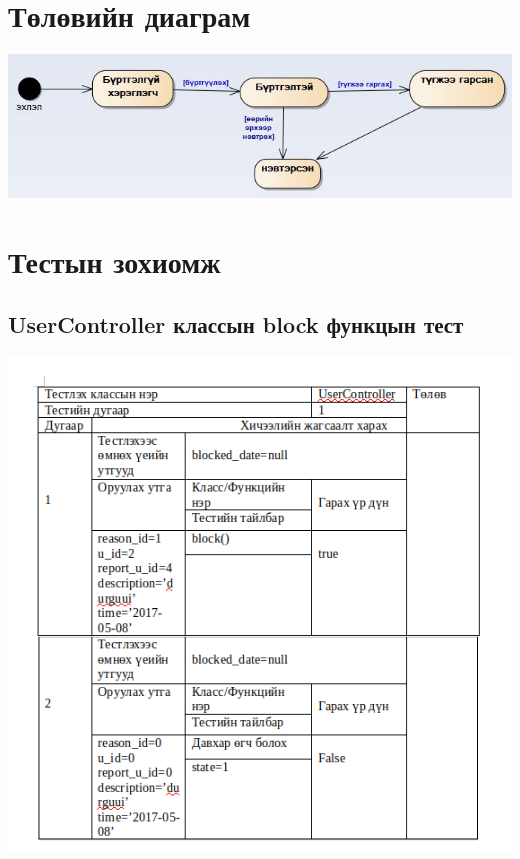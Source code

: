 \documentclass[
oneside, %
english, %
onehalfspacing, %
nolistspacing, %
headsepline, %
]{article} %
\begin{document}
      \section{Төлөвийн диаграм }
     \includegraphics[width=\textwidth]{statechartDiagram}
     
     \section{ Тестын зохиомж }
      \subsection{UserController классын block функцын тест }
     \includegraphics[width=\textwidth]{test1}
\end{document}
